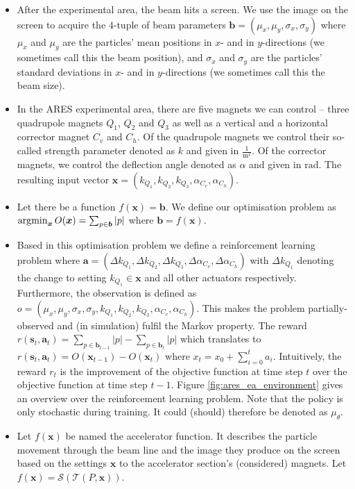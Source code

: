 \begin{itemize}
    \item After the experimental area, the beam hits a screen. We use the image on the screen to acquire the $4$-tuple of beam parameters $\bm{b} = (\mu_x, \mu_y, \sigma_x, \sigma_y)$ where $\mu_x$ and $\mu_y$ are the particles' mean positions in $x$- and in $y$-directions (we sometimes call this the beam position), and $\sigma_x$ and $\sigma_y$ are the particles' standard deviations in $x$- and in $y$-directions (we sometimes call this the beam size).
    \item In the ARES experimental area, there are five magnets we can control -- three quadrupole magnets $Q_1$, $Q_2$ and $Q_3$ as well as a vertical and a horizontal corrector magnet $C_v$ and $C_h$. Of the quadrupole magnets we control their so-called strength parameter denoted as $k$ and given in $\frac{1}{\text{m}^2}$. Of the corrector magnets, we control the deflection angle denoted as $\alpha$ and given in $\text{rad}$. The resulting input vector $\bm{x} = (k_{Q_1}, k_{Q_2}, k_{Q_3}, \alpha_{C_v}, \alpha_{C_h})$.
    \item Let there be a function $f(\bm{x}) = \bm{b}$. We define our optimisation problem as $\operatorname*{\arg\!\min}_{\bm{x}} O(\bm{x}) = \sum_{p \in \bm{b}} |p|$ where $\bm{b} = f(\bm{x})$.
    \item Based in this optimisation problem we define a reinforcement learning problem where $\bm{a} = (\Delta k_{Q_1}, \Delta k_{Q_2}, \Delta k_{Q_3}, \Delta \alpha_{C_v}, \Delta \alpha_{C_h})$ with $\Delta k_{Q_1}$ denoting the change to setting $k_{Q_1} \in \bm{x}$ and all other actuators respectively. Furthermore, the observation is defined as $o = (\mu_x, \mu_y, \sigma_x, \sigma_y, k_{Q_1}, k_{Q_2}, k_{Q_3}, \alpha_{C_v}, \alpha_{C_h})$. This makes the problem partially-observed and (in simulation) fulfil the Markov property. The reward $r(\bm{s}_t, \bm{a}_t) = \sum_{p \in \bm{b}_{t-1}} |p| - \sum_{p \in \bm{b}_t} |p|$ which translates to $r(\bm{s}_t, \bm{a}_t) = O(\bm{x}_{t-1}) - O(\bm{x}_t)$ where $x_t = x_0 + \sum_{i = 0}^t a_i$. Intuitively, the reward $r_t$ is the improvement of the objective function at time step $t$ over the objective function at time step $t-1$. Figure \ref{fig:ares_ea_environment} gives an overview over the reinforcement learning problem. Note that the policy is only stochastic during training. It could (should) therefore be denoted as $\mu_\theta$.
    \item Let $f(\bm{x})$ be named the accelerator function. It describes the particle movement through the beam line and the image they produce on the screen based on the settings $\bm{x}$ to the accelerator section's (considered) magnets. Let $f(\bm{x}) = \mathcal{S}(\mathcal{T}(P, \bm{x}))$.

\end{itemize}
